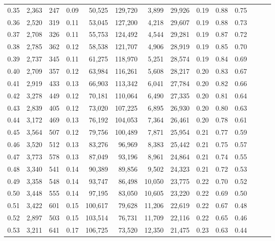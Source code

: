 \begin{tabular}{rrrrrrrrrrrrrr}
0.35 &  2,363 &  247 &  0.09 &   50,525 &  129,720 &   3,899 &  29,926 &  0.19 &  0.88 &      0.75 \\
0.36 &  2,520 &  319 &  0.11 &   53,045 &  127,200 &   4,218 &  29,607 &  0.19 &  0.88 &      0.73 \\
0.37 &  2,708 &  326 &  0.11 &   55,753 &  124,492 &   4,544 &  29,281 &  0.19 &  0.87 &      0.72 \\
0.38 &  2,785 &  362 &  0.12 &   58,538 &  121,707 &   4,906 &  28,919 &  0.19 &  0.85 &      0.70 \\
0.39 &  2,737 &  345 &  0.11 &   61,275 &  118,970 &   5,251 &  28,574 &  0.19 &  0.84 &      0.69 \\
0.40 &  2,709 &  357 &  0.12 &   63,984 &  116,261 &   5,608 &  28,217 &  0.20 &  0.83 &      0.67 \\
0.41 &  2,919 &  433 &  0.13 &   66,903 &  113,342 &   6,041 &  27,784 &  0.20 &  0.82 &      0.66 \\
0.42 &  3,278 &  449 &  0.12 &   70,181 &  110,064 &   6,490 &  27,335 &  0.20 &  0.81 &      0.64 \\
0.43 &  2,839 &  405 &  0.12 &   73,020 &  107,225 &   6,895 &  26,930 &  0.20 &  0.80 &      0.63 \\
0.44 &  3,172 &  469 &  0.13 &   76,192 &  104,053 &   7,364 &  26,461 &  0.20 &  0.78 &      0.61 \\
0.45 &  3,564 &  507 &  0.12 &   79,756 &  100,489 &   7,871 &  25,954 &  0.21 &  0.77 &      0.59 \\
0.46 &  3,520 &  512 &  0.13 &   83,276 &   96,969 &   8,383 &  25,442 &  0.21 &  0.75 &      0.57 \\
0.47 &  3,773 &  578 &  0.13 &   87,049 &   93,196 &   8,961 &  24,864 &  0.21 &  0.74 &      0.55 \\
0.48 &  3,340 &  541 &  0.14 &   90,389 &   89,856 &   9,502 &  24,323 &  0.21 &  0.72 &      0.53 \\
0.49 &  3,358 &  548 &  0.14 &   93,747 &   86,498 &  10,050 &  23,775 &  0.22 &  0.70 &      0.52 \\
0.50 &  3,448 &  555 &  0.14 &   97,195 &   83,050 &  10,605 &  23,220 &  0.22 &  0.69 &      0.50 \\
0.51 &  3,422 &  601 &  0.15 &  100,617 &   79,628 &  11,206 &  22,619 &  0.22 &  0.67 &      0.48 \\
0.52 &  2,897 &  503 &  0.15 &  103,514 &   76,731 &  11,709 &  22,116 &  0.22 &  0.65 &      0.46 \\
0.53 &  3,211 &  641 &  0.17 &  106,725 &   73,520 &  12,350 &  21,475 &  0.23 &  0.63 &      0.44 \\

\end{tabular}
